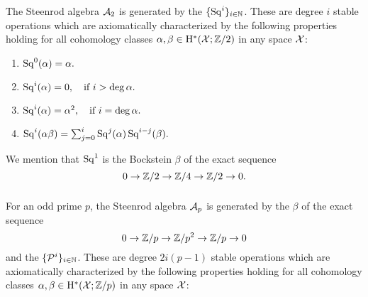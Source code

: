 %

\subsubsection{} 
The Steenrod algebra $\mathcal{A}_2$ is generated by the  $\{\operatorname{Sq}^i\}_{i \in \mathbb{N}}$.
These are degree $i$ stable operations which are axiomatically characterized by the following properties holding for all cohomology classes $\alpha,\beta \in \mathrm{H}^*(\mathcal{X}; \mathbb{Z}/2)$ in any space $\mathcal{X}$:
\begin{enumerate}
	\item \(\operatorname{Sq}^0(\alpha) = \alpha.\)
	\item \(\operatorname{Sq}^i(\alpha) = 0, \quad \text{if } i > \deg\alpha.\)
	\item \(\operatorname{Sq}^i(\alpha) = \alpha^2, \quad \text{if } i = \deg\alpha.\)
	\item \(\operatorname{Sq}^i(\alpha \beta) = \textstyle\sum_{j=0}^{i} \operatorname{Sq}^j(\alpha) \operatorname{Sq}^{i-j}(\beta).\)
\end{enumerate}
We mention that $\operatorname{Sq}^1$ is the Bockstein $\beta$ of the exact sequence
\[
0 \to \mathbb{Z}/2 \to \mathbb{Z}/4 \to \mathbb{Z}/2 \to 0.
\]

\subsubsection{} For an odd prime \(p\), the Steenrod algebra $\mathcal{A}_p$ is generated by the  \(\beta\) of the exact sequence
\[
0 \to \mathbb{Z}/p \to \mathbb{Z}/p^2 \to \mathbb{Z}/p \to 0
\]
and the  \(\{\mathcal{P}^i\}_{i \in \mathbb{N}}\).
These are degree \(2i(p-1)\) stable operations which are axiomatically characterized by the following properties holding for all cohomology classes \(\alpha, \beta \in \mathrm{H}^*(\mathcal{X}; \mathbb{Z}/p)\) in any space \(\mathcal{X}\):

